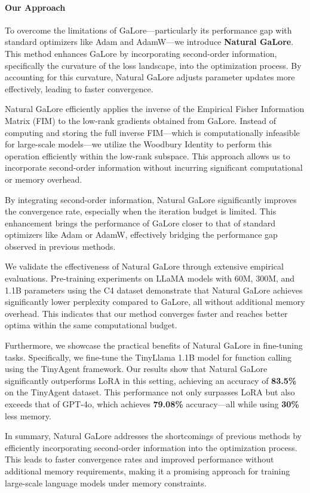 \paragraph{Our Approach}

 To overcome the limitations of GaLore—particularly its performance gap with standard optimizers like Adam and AdamW—we introduce \textbf{Natural GaLore}. This method enhances GaLore by incorporating second-order information, specifically the curvature of the loss landscape, into the optimization process. By accounting for this curvature, Natural GaLore adjusts parameter updates more effectively, leading to faster convergence.

 Natural GaLore efficiently applies the inverse of the Empirical Fisher Information Matrix (FIM) to the low-rank gradients obtained from GaLore. Instead of computing and storing the full inverse FIM—which is computationally infeasible for large-scale models—we utilize the Woodbury Identity to perform this operation efficiently within the low-rank subspace. This approach allows us to incorporate second-order information without incurring significant computational or memory overhead.

 By integrating second-order information, Natural GaLore significantly improves the convergence rate, especially when the iteration budget is limited. This enhancement brings the performance of GaLore closer to that of standard optimizers like Adam or AdamW, effectively bridging the performance gap observed in previous methods.

 We validate the effectiveness of Natural GaLore through extensive empirical evaluations. Pre-training experiments on LLaMA models with 60M, 300M, and 1.1B parameters using the C4 dataset demonstrate that Natural GaLore achieves significantly lower perplexity compared to GaLore, all without additional memory overhead. This indicates that our method converges faster and reaches better optima within the same computational budget.

 Furthermore, we showcase the practical benefits of Natural GaLore in fine-tuning tasks. Specifically, we fine-tune the TinyLlama 1.1B model for function calling using the TinyAgent framework. Our results show that Natural GaLore significantly outperforms LoRA in this setting, achieving an accuracy of \textbf{83.5\%} on the TinyAgent dataset. This performance not only surpasses LoRA but also exceeds that of GPT-4o, which achieves \textbf{79.08\%} accuracy—all while using \textbf{30\%} less memory.

 In summary, Natural GaLore addresses the shortcomings of previous methods by efficiently incorporating second-order information into the optimization process. This leads to faster convergence rates and improved performance without additional memory requirements, making it a promising approach for training large-scale language models under memory constraints.




